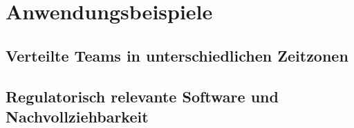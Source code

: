 \pagebreak

\section{Anwendungsbeispiele}
\subsection{Verteilte Teams in unterschiedlichen Zeitzonen}
\subsection{Regulatorisch relevante Software und Nachvollziehbarkeit}

